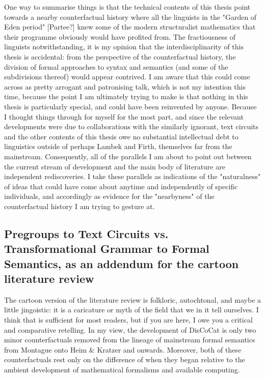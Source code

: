 One way to summarise things is that the technical contents of this thesis point towards a nearby counterfactual history where all the linguists in the "Garden of Eden period" [Partee?] knew some of the modern structuralist mathematics that their programme obviously would have profited from. The fractiousness of linguists notwithstanding, it is my opinion that the interdisciplinarity of this thesis is accidental: from the perspective of the counterfactual history, the division of formal approaches to syntax and semantics (and some of the subdivisions thereof) would appear contrived. I am aware that this could come across as pretty arrogant and patronising talk, which is not my intention this time, because the point I am ultimately trying to make is that nothing in this thesis is particularly special, and could have been reinvented by anyone. Because I thought things through for myself for the most part, and since the relevant developments were due to collaborations with the similarly ignorant, text circuits and the other contents of this thesis owe no substantial intellectual debt to linguistics outside of perhaps Lambek and Firth, themselves far from the mainstream. Consequently, all of the parallels I am about to point out between the current stream of development and the main body of literature are independent rediscoveries. I take these parallels as indications of the "naturalness" of ideas that could have come about anytime and independently of specific individuals, and accordingly as evidence for the "nearbyness" of the counterfactual history I am trying to gesture at.

\subsection{Pregroups to Text Circuits vs. Transformational Grammar to Formal Semantics, as an addendum for the cartoon literature review}

The cartoon version of the literature review is folkloric, autochtonal, and maybe a little jingoistic: it is a caricature or myth of the field that we in it tell ourselves. I think that is sufficient for most readers, but if you are here, I owe you a critical and comparative retelling. In my view, the development of DisCoCat is only two minor counterfactuals removed from the lineage of mainstream formal semantics from Montague onto Heim \& Kratzer and onwards. Moreover, both of these counterfactuals rest only on the difference of when they began relative to the ambient development of mathematical formalisms and available computing.\\

